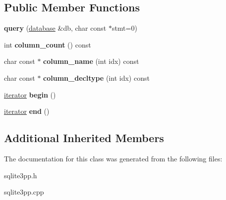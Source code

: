 \subsection*{Public Member Functions}
\begin{DoxyCompactItemize}
\item 
\hypertarget{classsqlite3pp_1_1query_ae8401752284f0855debd91c435f13fb3}{{\bfseries query} (\hyperlink{classsqlite3pp_1_1database}{database} \&db, char const $\ast$stmt=0)}\label{classsqlite3pp_1_1query_ae8401752284f0855debd91c435f13fb3}

\item 
\hypertarget{classsqlite3pp_1_1query_a174cfff81897580685ff999d498fb459}{int {\bfseries column\-\_\-count} () const }\label{classsqlite3pp_1_1query_a174cfff81897580685ff999d498fb459}

\item 
\hypertarget{classsqlite3pp_1_1query_ac4aea749613026c3519eafee2189f020}{char const $\ast$ {\bfseries column\-\_\-name} (int idx) const }\label{classsqlite3pp_1_1query_ac4aea749613026c3519eafee2189f020}

\item 
\hypertarget{classsqlite3pp_1_1query_ac36113f906c0a9285ceeb900a3a7cbea}{char const $\ast$ {\bfseries column\-\_\-decltype} (int idx) const }\label{classsqlite3pp_1_1query_ac36113f906c0a9285ceeb900a3a7cbea}

\item 
\hypertarget{classsqlite3pp_1_1query_a22b1c6cfc91c5c31d8f0be7a71e2b9e4}{\hyperlink{classsqlite3pp_1_1query_1_1query__iterator}{iterator} {\bfseries begin} ()}\label{classsqlite3pp_1_1query_a22b1c6cfc91c5c31d8f0be7a71e2b9e4}

\item 
\hypertarget{classsqlite3pp_1_1query_a005f2a324a5c2c724cfd0ecf02d618be}{\hyperlink{classsqlite3pp_1_1query_1_1query__iterator}{iterator} {\bfseries end} ()}\label{classsqlite3pp_1_1query_a005f2a324a5c2c724cfd0ecf02d618be}

\end{DoxyCompactItemize}
\subsection*{Additional Inherited Members}


The documentation for this class was generated from the following files\-:\begin{DoxyCompactItemize}
\item 
sqlite3pp.\-h\item 
sqlite3pp.\-cpp\end{DoxyCompactItemize}
